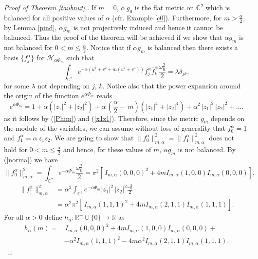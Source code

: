 \documentclass[11pt, reqno]{amsart}
\begin{document}
\noindent
\begin{proof}
[Proof of Theorem \ref{taubnut}.]
If $m=0$, $\alpha\,g_0$ is the flat metric on ${\mathbb{C}}^2$ which is balanced for all positive values of $\alpha$ (cfr. Example \ref{c0}). Furthermore, for $m>\frac{\alpha}{2}$, by Lemma \ref{pind}, $\alpha g_m$ is not projectively induced and hence it cannot be balanced. Thus the proof of the theorem will be achieved if we show that $\alpha g_m$ is not balanced for  $0<m\leq \frac{\alpha}{2}$. Notice that if  $\alpha g_m$ is balanced
then there exists a basis $\{f_j^{\alpha} \}$ for ${\mathcal{H}}_{\alpha \Phi_m}$ such that
\begin{equation}\label{balancedTN}
\int_{{\mathbb{C}}^2}e^{-\alpha \left(u^2+v^2+m(u^4+v^4)\right)}f_j^{\alpha}\bar f_k^{\alpha}\frac{\omega_0^2}{2}=\lambda\delta_{jk},
\end{equation}
for some $\lambda$ not depending on $j$, $k$.
Notice also that
the power expansion around the origin of the function $e^{\alpha\Phi_m}$ reads
\begin{equation}
e^{\alpha\Phi_m}=1+\alpha(|z_1|^2+|z_2|^2)+ \alpha\,\left(\frac{\alpha}{2}-\,m\right)\left(|z_1|^4+|z_2|^4\right)+ \alpha ^2\,|z_1|^2\,|z_2|^2+\dots.\nonumber
\end{equation}
as it follows  by (\ref{Phim}) and (\ref{x1z1}). Therefore,
since the metric $g_m$ depends on the module of the variables, we can assume without loss of generality that $f_0^{\alpha}=1$ and $f_1^{\alpha}=\alpha\,z_1z_2$.
We are going to show that  $\|f_0^{\alpha}\|^2_{m, \alpha}= \|f_1^{\alpha}\|^2_{m, \alpha}$ does not hold for $0<m\leq\frac{\alpha}{2}$  and hence,
for these values of $m$, $\alpha g_m$ is not balanced.
By (\ref{norma}) we have
\begin{equation}
\|f_0^{\alpha}\|^2_{m, \alpha}=\int_{{\mathbb{C}}^2}e^{-\alpha \Phi_m}\frac{\omega_0^2}{2}=\pi^2\left[\, I_{m, \alpha}(0,0,0)^2 + 4m I_{m, \alpha}(1,0,0 ) I_{m, \alpha}(0,0,0) \right],
\end{equation}
\begin{equation}
\begin{split}
\|f_1^{\alpha}\|^2_{m, \alpha}&=
\alpha^2\int_{{\mathbb{C}}^2}e^{-\alpha \Phi_m}|z_1|^2\,|z_2|^2\frac{\omega_0^2}{2}\\
&=\alpha^2\pi^2\left[\, I_{m, \alpha}(1,1,1)^2 + 4m I_{m, \alpha}(2,1,1 ) I_{m, \alpha}(1,1,1) \right].
\end{split}
\end{equation}
For all $\alpha>0$ define $h_{\alpha}\!:{\mathbb{R}}^+\cup\{0\}{\rightarrow} {\mathbb{R}}$ as
\begin{equation}
\begin{split}
h_{\alpha}(m)=&\,I_{m, \alpha}(0,0,0)^2 + 4m I_{m, \alpha}(1,0,0 ) I_{m, \alpha}(0,0,0)+\\
&-\alpha^2I_{m, \alpha}(1,1,1)^2 - 4m \alpha^2 I_{m, \alpha}(2,1,1 ) I_{m, \alpha}(1,1,1).\nonumber
\end{split}
\end{equation}


\end{proof}
\end{document}
